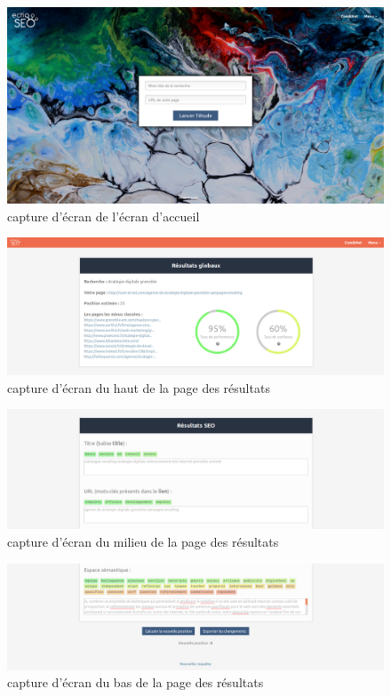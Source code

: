 \documentclass[12pt]{article}
\begin{document}
\begin{appendices}
\begin{figure}[p]
	\centering
	\includegraphics[scale=0.25]{ecranAccueil.jpg}
	\caption{capture d'écran de l'écran d'accueil}
\end{figure}
\begin{figure}[p]
	\centering
	\includegraphics[scale=0.25]{hautDePage.png}
	\caption{capture d'écran du haut de la page des résultats}
\end{figure}
\begin{figure}[p]
	\centering
	\includegraphics[scale=0.25]{milieuDePage.png}
	\caption{capture d'écran du milieu de la page des résultats}
\end{figure}
\begin{figure}[p]
	\centering
	\includegraphics[scale=0.25]{basDePage.png}
	\caption{capture d'écran du bas de la page des résultats}
\end{figure}


\end{appendices}
\end{document}
